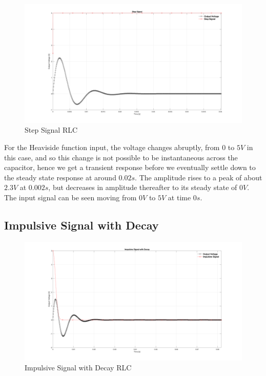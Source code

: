 \documentclass[a4paper, 12pt]{article}
\begin{document}
\begin{figure}[h]
\centering
\includegraphics[width=\textwidth]{ex3/Step_Signal.png}
\caption{Step Signal RLC}
\end{figure}

For the Heaviside function input, the voltage changes abruptly, from $0$ to $5V$ in this case, and so this change is not possible to be instantaneous across the capacitor, hence we get a transient response before we eventually settle down to the steady state response at around $0.02s$. The amplitude rises to a peak of about $2.3V$ at $0.002s$, but decreases in amplitude thereafter to its steady state of $0V$. The input signal can be seen moving from $0V$ to $5V$ at time $0s$.

\newpage
\subsection{Impulsive Signal with Decay}

\begin{figure}[h]
\centering
\includegraphics[width=\textwidth]{ex3/ImpulsiveSignal.png}
\caption{Impulsive Signal with Decay RLC}
\end{figure}
\end{document}
